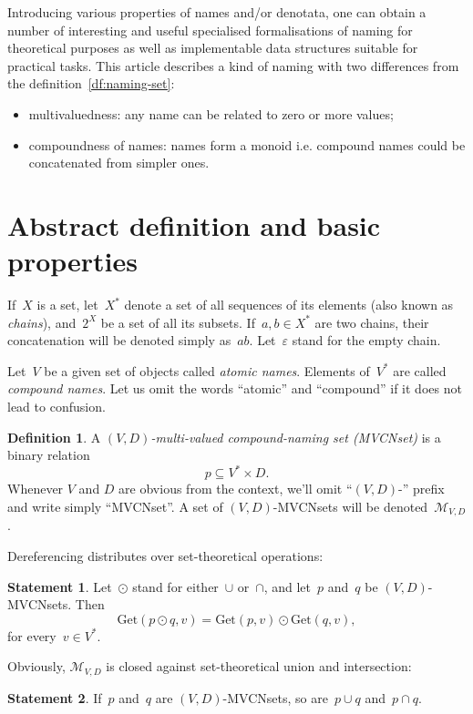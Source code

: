 \documentclass{article}
\theoremstyle{definition}
\newtheorem{Df}{Definition}
\newtheorem{St}{Statement}
\newcommand{\setcharmvcn}{M}
\newcommand{\setsymbol}[3]{\mathcal{#1}_{#2,#3}}
\newcommand{\setmvcn}[2]{\setsymbol{\setcharmvcn}{#1}{#2}}
\newcommand{\deref}[2]{\mathrm{Get}(#1, #2)}
\begin{document}
Introducing various properties of names and/or denotata, one can obtain a
number of interesting and useful specialised formalisations of naming for
theoretical purposes as well as implementable data structures suitable for
practical tasks. This article describes a kind of naming with
two differences from the definition~\ref{df:naming-set}:
\begin{itemize}
\item multivaluedness: any name can be related to zero or more values;
\item compoundness of names: names form a monoid i.e. compound names could
be concatenated from simpler ones.
\end{itemize}


\section{Abstract definition and basic properties}

If~$X$ is a set, let~$X^\ast$ denote a set of all sequences of its elements
(also known as \emph{chains}), and~$2^X$ be a set of all its subsets.
If~$a,b\in X^\ast$ are two chains, their concatenation will be denoted simply
as~$ab$. Let~$\varepsilon$ stand for the empty chain.

Let~$V$ be a given set of objects called \emph{atomic names}. Elements
of~$V^\ast$ are called \emph{compound names}. Let us omit the words ``atomic''
and ``compound'' if it does not lead to confusion.

\begin{Df}\label{df:mvcn}
A \emph{$(V,D)$-multi-valued compound-naming set (MVCNset)} is a binary
relation
\[
  p \subseteq V^\ast \times D .
\]
Whenever $V$ and $D$ are obvious from the context, we'll omit ``$(V,D)$-''
prefix and write simply ``MVCNset''. A set of $(V,D)$-MVCNsets will be
denoted~$\setmvcn{V}{D}$.
\end{Df}

Dereferencing distributes over set-theoretical operations:
\begin{St}\label{st:mvcn-deref-distributivity}
Let~$\odot$ stand for either~$\cup$ or~$\cap$, and let~$p$ and~$q$ be
$(V,D)$-MVCNsets. Then
\[
  \deref{p\odot q}{v} = \deref{p}{v} \odot \deref{q}{v} ,
\]
for every~$v\in V^\ast$.
\end{St}

Obviously, $\setmvcn{V}{D}$ is closed against set-theoretical union
and intersection:
\begin{St}\label{st:mvcn-setop}
If~$p$ and~$q$ are $(V,D)$-MVCNsets, so are~$p\cup q$ and~$p\cap q$.
\end{St}
\end{document}
